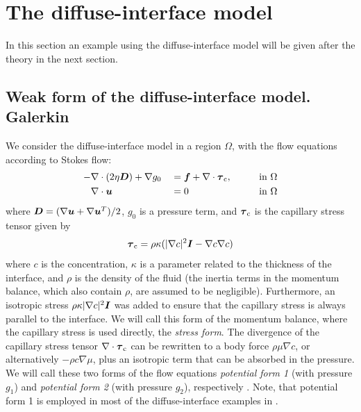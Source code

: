 \def\headdate{30th Sep 2021}

\section{The diffuse-interface model}
\label{sec:examples_dim}

In this section an example using the diffuse-interface model will be given
after the theory in the next section.

\subsection{Weak form of the diffuse-interface model. Galerkin \fem}

We consider the diffuse-interface model in a region $\Omega$, with the flow
equations according to Stokes flow:
\begin{alignat}{3}
-&\nabla\cdot(2\eta \boldsymbol{D})+\nabla g_0&&=\boldsymbol{f}+\nabla \cdot \boldsymbol{\tau}_\text{c}, &&\qquad\text{in }\Omega \label{eq:di1}\\
&\nabla\cdot\boldsymbol{u} &&=0 &&\qquad\text{in }\Omega \label{eq:di2}
\end{alignat}
where $\boldsymbol{D}=(\nabla\boldsymbol{u}+\nabla\boldsymbol{u}^T)/2$, $g_0$ is a pressure term, and 
$\boldsymbol{\tau}_\text{c}$ is the 
capillary stress tensor given by
\[
\boldsymbol{\tau}_\text{c} = \rho \kappa (|\nabla c|^2 \boldsymbol{I} - \nabla c \nabla c)
\]
where $c$ is the concentration, $\kappa$ is a parameter related to the thickness
of the interface,  and $\rho$ is the density of the fluid (the inertia
terms in the momentum balance, which also contain $\rho$, are assumed to be 
negligible). Furthermore, an isotropic stress 
$\rho \kappa |\nabla c|^2 \boldsymbol{I}$ was added to ensure 
that the capillary stress is always parallel to the interface. We will call 
this form of the momentum balance, where the capillary stress is used directly, 
the \emph{stress form}. The divergence 
of the capillary stress tensor $\nabla \cdot \boldsymbol{\tau}_\text{c}$ can be 
rewritten to a body force $\rho \mu \nabla c$, or alternatively $-\rho c\nabla 
\mu$, plus an isotropic term that can be absorbed in the pressure. We will call 
these two forms of the 
flow equations \emph{potential form 1} (with pressure $g_1$) and 
\emph{potential form 
	2} (with pressure $g_2$), 
respectively \cite{Jaensson2015}. Note, that 
potential form 1 is employed in most of the 
diffuse-interface examples in \tfem.


